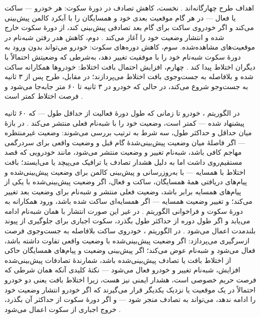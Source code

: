 اهداف طرح چهارگانه‌اند \cite{al-aniPrivacySafetyImprovement2023}. نخست، کاهش تصادف در دورهٔ سکوت: هر خودرو — ساکت یا فعال — در هر گام موقعیت بعدی خود و همسایگان را با آبکرد کالمن پیش‌بینی می‌کند و اگر خودروی ساکت برای گام بعد تصادفی پیش‌بینی کند، از دورهٔ سکوت خارج شده و انتشار وضعیت خود را آغاز می‌کند \cite{al-aniPrivacySafetyImprovement2023}. دوم، کاهش هدر رفتن شبه‌نام در موقعیت‌های مشاهده‌شده. سوم، کاهش دوره‌های سکوت: خودرو می‌تواند بدون ورود به دورهٔ سکوت شبه‌نام خود را با موفقیت تغییر دهد، به‌شرطی که وضعیتش احتمالاً با دیگران اختلاط پیدا کند \cite{al-aniPrivacySafetyImprovement2023}. چهارم، افزایش احتمال بافت اختلاط: خودروها همکارانه ساکت شده و بلافاصله به جست‌وجوی بافت اختلاط می‌پردازند؛ در مقابل، طرح  پس از ۳ ثانیه به جست‌وجو شروع می‌کند، در حالی که خودرو در ۳ ثانیه تا ۶۰ متر جابه‌جا می‌شود و فرصت اختلاط کمتر است \cite{al-aniPrivacySafetyImprovement2023}.

در الگوریتم ، خودرو تا زمانی که طول دورهٔ فعالیت از حداقل طول — که ۶۰ ثانیه پیشنهاد شده — کمتر است، وضعیت خود را با شبه‌نام فعلی منتشر می‌کند \cite{al-aniPrivacySafetyImprovement2023}. در بازهٔ میان حداقل و حداکثر طول، سه شرط به ترتیب بررسی می‌شوند: وضعیت غیرمنتظره — اگر فاصلهٔ میان وضعیت پیش‌بینی‌شدهٔ گام قبل و وضعیت واقعی برای سردرگمی مهاجم کافی باشد، شبه‌نام تغییر و وضعیت منتشر می‌شود، مانند خودرویی که قصد مستقیم‌روی داشت اما به دلیل هشدار تصادف یا ترافیک می‌پیچد یا می‌ایستد؛ بافت اختلاط با همسایه — با به‌روزرسانی و پیش‌بینی کالمن برای وضعیت پیش‌بینی‌شده و پیام‌های دریافتی همهٔ همسایگان، ساکت و فعال، اگر وضعیت پیش‌بینی‌شده با یکی از پیام‌های همسایه برابر باشد، وضعیت فعلی منتشر و شبه‌نام برای وضعیت بعد تغییر می‌کند؛ و تغییر وضعیت همسایه — اگر همسایه‌ای ساکت شده باشد، ورود همکارانه به دورهٔ سکوت و فراخوانی الگوریتم  \cite{al-aniPrivacySafetyImprovement2023}. در غیر این صورت انتشار با همان شبه‌نام ادامه می‌یابد و اگر طول دوره از حداکثر طول بگذرد، سکوت اجباری برای جلوگیری از پیوند بلندمدت اعمال می‌شود \cite{al-aniPrivacySafetyImprovement2023}. در الگوریتم ، خودروی ساکت بلافاصله به جست‌وجوی فرصت ازسرگیری می‌پردازد: اگر وضعیت پیش‌بینی‌شده با وضعیت واقعی تفاوت داشته باشد، فعال می‌شود و شبه‌نام عوض می‌کند؛ اگر پیش‌بینی وضعیت و پیام‌های همسایگان حاکی از اختلاط بافت یا تصادف پیش‌بینی‌شده باشد، شمارندهٔ تصادفات پیش‌بینی‌شده افزایش، شبه‌نام تغییر و خودرو فعال می‌شود — نکتهٔ کلیدی آنکه همان شرطی که فرصت حریم خصوصی است، هشدار ایمنی نیز هست، زیرا اختلاط بافت یعنی دو خودرو احتمالاً در یک موقعیت یا نزدیک یکدیگر قرار می‌گیرند که اگر خودرو انتشار وضعیت خود را ادامه ندهد، می‌تواند به تصادف منجر شود — و اگر دورهٔ سکوت از حداکثر آن بگذرد، خروج اجباری از سکوت اعمال می‌شود \cite{al-aniPrivacySafetyImprovement2023}.

